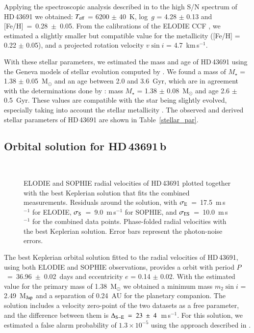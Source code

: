 \documentclass{aa}
\begin{document}
Applying the spectroscopic analysis described in \citet{Santosetal2004} to
the high S/N spectrum of HD\,43691 we obtained: $T_{\rm eff}$ = 6200 $\pm$
40~K, log~$g$ = 4.28 $\pm$ 0.13 and [Fe/H]~=~0.28~$\pm$~0.05. From the
calibrations of the ELODIE CCF \citep{Santosetal2002,Naef2003}, we estimated
a slightly smaller but compatible value for the metallicity ([Fe/H] = 0.22
$\pm$ 0.05), and a projected rotation velocity $v{\sin i}$ =
4.7~km\,s$^{-1}$.

With these stellar parameters, we estimated the mass and age of HD\,43691
using the Geneva models of stellar evolution computed by
\citet{Schaereretal1993}. We found a mass of $M_\star$ = 1.38 $\pm$
0.05~M$_{\odot}$ and an age between 2.0 and 3.6~Gyr, which are in agreement
with the determinations done by \citet{Nordstrometal2004}: mass $M_\star$ =
1.38 $\pm$ 0.08~M$_{\odot}$ and age 2.6 $\pm$ 0.5~Gyr. These values are
compatible with the star being slightly evolved, especially taking into
account the stellar metallicity \citep{Mowlavietal1998}. The observed and
derived stellar parameters of HD\,43691 are shown in
Table~\ref{stellar_par}.

\subsection{Orbital solution for HD\,43691\,b}
\begin{figure}[t!]
\centering
  \begin{minipage}[t]{0.45\textwidth}
    \centering
  \end{minipage} \\
  \begin{minipage}[t]{0.45\textwidth}
    \centering
  \end{minipage}\caption{\top ELODIE and SOPHIE radial velocities of HD\,43691 plotted
           together with the best Keplerian solution that fits the combined
	   measurements.
	   \mid Residuals around the solution, with
	   $\sigma_{\rm E}$~=~17.5~m\,s$^{-1}$ for ELODIE,
	   $\sigma_{\rm S}$~=~9.0~m\,s$^{-1}$ for SOPHIE, and
	   $\sigma_{\rm ES}$~=~10.0~m\,s$^{-1}$ for the combined data
	   points.
	   \bot Phase-folded radial velocities with the best Keplerian
	   solution. Error bars represent the photon-noise errors.}
  \label{rv_1}
\end{figure}


The best Keplerian orbital solution fitted to the radial velocities of
HD\,43691, using both ELODIE and SOPHIE observations, provides a orbit with
period $P$~=~36.96~$\pm$~0.02~days and eccentricity $e$ = 0.14 $\pm$ 0.02.
With the estimated value for the primary mass of 1.38~M$_{\odot}$ we
obtained a minimum mass $m_2 {\sin i}$ = 2.49~M$_{\rm Jup}$ and a
separation of 0.24~AU for the planetary companion. The solution includes a
velocity zero-point of the two datasets as a free parameter, and the
difference between them is $\Delta_{\rm S-E}~=~23~\pm~4$~m\,s$^{-1}$. For
this solution, we estimated a false alarm probability of \mbox{$1.3 \times
10^{-5}$} using the approach described in \citet{HorneBaliunas1986}.
 
\end{document}
